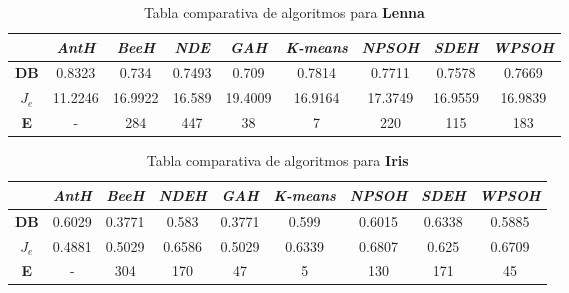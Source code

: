\begin{table}[h!]
\footnotesize
\begin{center}
\begin{tabular}{|c|c|c|c|c|c|c|c|c|}
\hline
 & \emph{AntH} & \emph{BeeH} & \emph{NDE} & \emph{GAH} & \emph{K-means} & \emph{NPSOH} & \emph{SDEH} & \emph{WPSOH} \\
\hline
{\bf DB} & 0.8323    & 0.734   & 0.7493 & 0.709   & 0.7814  & 0.7711  & 0.7578  & 0.7669 \\
\hline
$J_e$    & 11.2246   & 16.9922 & 16.589 & 19.4009 & 16.9164 & 17.3749 & 16.9559 & 16.9839 \\
\hline
{\bf E} & - & 284     & 447    & 38      & 7       & 220     & 115     & 183     \\
\hline
\end{tabular}
\caption{Tabla comparativa de algoritmos para {\bf Lenna}}
\label{tb:tableresimg}
\end{center}
\end{table}

\begin{table}[h!]
\footnotesize
\begin{center}
\begin{tabular}{|c|c|c|c|c|c|c|c|c|}
\hline
 & \emph{AntH} & \emph{BeeH} & \emph{NDEH} & \emph{GAH} & \emph{K-means} & \emph{NPSOH} & \emph{SDEH} & \emph{WPSOH} \\
\hline
{\bf DB}  & 0.6029  & 0.3771 & 0.583  & 0.3771 & 0.599  & 0.6015 & 0.6338 & 0.5885 \\
\hline
$J_e$     & 0.4881  & 0.5029 & 0.6586 & 0.5029 & 0.6339 & 0.6807 & 0.625  & 0.6709 \\
\hline
{\bf E}  & - & 304    & 170    & 47     & 5      & 130    & 171    & 45     \\
\hline
\end{tabular}
\caption{Tabla comparativa de algoritmos para {\bf Iris}}
\label{tb:tableresimg}
\end{center}
\end{table}
